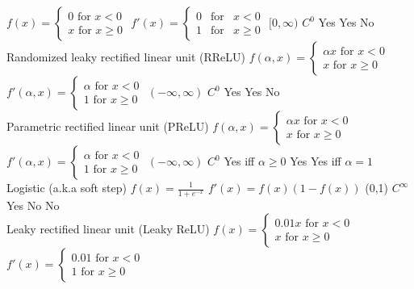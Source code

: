 \documentclass[]{book}
\begin{document}
\(f(x)=\left\{{\begin{array}{rcl}0{\mbox{ for }}x<0\\x{\mbox{ for }}x\geq 0\end{array}}\right.\)
\textbar{}
\(f'(x)=\left\{{\begin{array}{rcl}0&{\mbox{for}}&x<0\\1&{\mbox{for}}&x\geq 0\end{array}}\right.\)
\textbar{} \([0,\infty)\) \textbar{} \(C^0\) \textbar{} Yes \textbar{}
Yes \textbar{} No \textbar{}\\
Randomized leaky rectified linear unit (RReLU) \textbar{} \textbar{}
\(f(\alpha ,x)=\left\{{\begin{array}{rcl}\alpha x {\mbox{ for }}x<0\\x{\mbox{ for }}x\geq 0\end{array}}\right.\)
\textbar{}
\(f'(\alpha ,x)=\left\{{\begin{array}{rcl}\alpha {\mbox{ for }}x<0\\1{\mbox{ for }}x\geq 0\end{array}}\right.\)
\textbar{} \((-\infty, \infty)\) \textbar{} \(C^0\) \textbar{} Yes
\textbar{} Yes \textbar{} No \textbar{}\\
Parametric rectified linear unit (PReLU) \textbar{} \textbar{}
\(f(\alpha ,x)=\left\{{\begin{array}{rcl}\alpha x{\mbox{ for }}x<0\\x{\mbox{ for }}x\geq 0\end{array}}\right.\)
\textbar{}
\(f'(\alpha ,x)=\left\{{\begin{array}{rcl}\alpha {\mbox{ for }}x<0\\1{\mbox{ for }}x\geq 0\end{array}}\right.\)
\textbar{} \((-\infty, \infty)\) \textbar{} \(C^0\) \textbar{} Yes iff
\(\alpha \geq 0\) \textbar{} Yes \textbar{} Yes iff \(\alpha = 1\)
\textbar{}\\
Logistic (a.k.a soft step) \textbar{} \textbar{}
\(f(x)={\frac {1}{1+e^{-x}}}\) \textbar{} \(f'(x)=f(x)(1-f(x))\)
\textbar{} (0,1) \textbar{} \(C^\infty\) \textbar{} Yes \textbar{} No
\textbar{} No \textbar{}\\
Leaky rectified linear unit (Leaky ReLU) \textbar{} \textbar{}
\(f(x)=\left\{{\begin{array}{rcl}0.01x{\mbox{ for }}x<0\\x{\mbox{ for }}x\geq 0\end{array}}\right.\)
\textbar{}
\(f'(x)=\left\{{\begin{array}{rcl}0.01{\mbox{ for }}x<0\\1{\mbox{ for }}x\geq 0\end{array}}\right.\)
\end{document}
